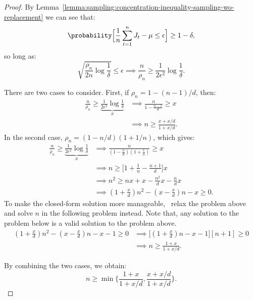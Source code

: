 \begin{proof}
    By Lemma~\ref{lemma:sampling:concentration-inequality-sampling-wo-replacement}
    we can see that:
    \begin{equation*}
        \probability\Big[ \frac{1}{n} \sum_{t = 1}^n J_t - \mu \leq \epsilon \Big] \geq 1 - \delta,
    \end{equation*}
    so long as:
    \begin{equation*}
        \sqrt{\frac{\rho_n}{2n} \log \frac{1}{\delta}} \leq \epsilon \implies
        \frac{n}{\rho_n} \geq \frac{1}{2\epsilon^2} \log\frac{1}{\delta}.
    \end{equation*}

    There are two cases to consider. First, if $\rho_n = 1 - (n-1)/d$, then:
    \begin{align*}
        \frac{n}{\rho_n} \geq \underbrace{\frac{1}{2\epsilon^2} \log\frac{1}{\delta}}_x
        &\implies
        \frac{n}{1 - \frac{n - 1}{d}} \geq x \\
        &\implies n \geq \frac{x + x/d}{1 + x/d}.
    \end{align*}
    In the second case, $\rho_n = (1 - n/d)(1 + 1/n)$, which gives:
    \begin{align*}
        \frac{n}{\rho_n} \geq \underbrace{\frac{1}{2\epsilon^2} \log\frac{1}{\delta}}_x
        &\implies
        \frac{n}{(1 - \frac{n}{d})(1 + \frac{1}{n})} \geq x \\
        &\implies n \geq \Big[ 1 + \frac{1}{n} - \frac{n + 1}{d} \Big] x \\
        &\implies n^2 \geq nx + x - \frac{n^2}{d}x - \frac{n}{d}x \\
        &\implies (1 + \frac{x}{d}) n^2 - (x - \frac{x}{d})n - x \geq 0.
    \end{align*}
    To make the closed-form solution more
    manageable,~\cite{Liu2019banditMIPS} relax the problem above and solve $n$ in the following
    problem instead. Note that, any solution to the problem below is a valid solution
    to the problem above.
    \begin{align*}
        (1 + \frac{x}{d}) n^2 - (x - \frac{x}{d})n - x - 1\geq 0
        &\implies \Big[ (1 + \frac{x}{d}) n - x - 1 \Big][n + 1] \geq 0 \\
        &\implies n \geq \frac{1 + x}{1 + x/d}.
    \end{align*}

    By combining the two cases, we obtain:
    \begin{equation*}
        n \geq \min \{ \frac{1 + x}{1 + x/d}, \frac{x + x/d}{1 + x/d} \}.
    \end{equation*}
\end{proof}

